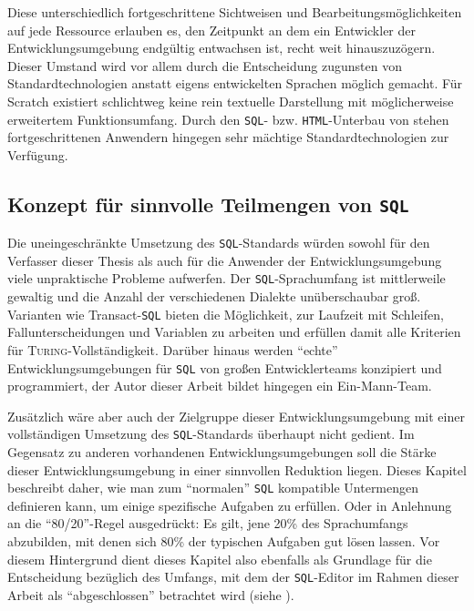 Diese unterschiedlich fortgeschrittene Sichtweisen und Bearbeitungsmöglichkeiten auf jede Ressource erlauben es, den Zeitpunkt an dem ein Entwickler der Entwicklungsumgebung endgültig entwachsen ist, recht weit hinauszuzögern. Dieser Umstand wird vor allem durch die Entscheidung zugunsten von Standardtechnologien anstatt eigens entwickelten Sprachen möglich gemacht. Für Scratch existiert schlichtweg keine rein textuelle Darstellung mit möglicherweise erweitertem Funktionsumfang. Durch den \texttt{SQL}- bzw. \texttt{HTML}-Unterbau von \idename{} stehen fortgeschrittenen Anwendern hingegen sehr mächtige Standardtechnologien zur Verfügung.

\subsection{Konzept für sinnvolle Teilmengen von \texttt{SQL}}
\label{sec:sql-subset}

Die uneingeschränkte Umsetzung des \texttt{SQL}-Standards würden sowohl für den Verfasser dieser Thesis als auch für die Anwender der Entwicklungsumgebung viele unpraktische Probleme aufwerfen. Der \texttt{SQL}-Sprachumfang ist mittlerweile gewaltig und die Anzahl der verschiedenen Dialekte unüberschaubar groß. Varianten wie Transact-\texttt{SQL} bieten die Möglichkeit, zur Laufzeit mit Schleifen, Fallunterscheidungen und Variablen zu arbeiten und erfüllen damit alle Kriterien für \textsc{Turing}-Vollständigkeit. Darüber hinaus werden ``echte'' Entwicklungsumgebungen für \texttt{SQL} von großen Entwicklerteams konzipiert und programmiert, der Autor dieser Arbeit bildet hingegen ein Ein-Mann-Team.


Zusätzlich wäre aber auch der Zielgruppe dieser Entwicklungsumgebung mit einer vollständigen Umsetzung des \texttt{SQL}-Standards überhaupt nicht gedient. Im Gegensatz zu anderen vorhandenen Entwicklungsumgebungen soll die Stärke dieser Entwicklungsumgebung in einer sinnvollen Reduktion liegen. Dieses Kapitel beschreibt daher, wie man zum "`normalen"' \texttt{SQL} kompatible Untermengen definieren kann, um einige spezifische Aufgaben zu erfüllen. Oder in Anlehnung an die "`80/20"'-Regel ausgedrückt: Es gilt, jene 20\% des Sprachumfangs abzubilden, mit denen sich 80\% der typischen Aufgaben gut lösen lassen. Vor diesem Hintergrund dient dieses Kapitel also ebenfalls als Grundlage für die Entscheidung bezüglich des Umfangs, mit dem der \texttt{SQL}-Editor im Rahmen dieser Arbeit als "`abgeschlossen"' betrachtet wird (siehe ).

